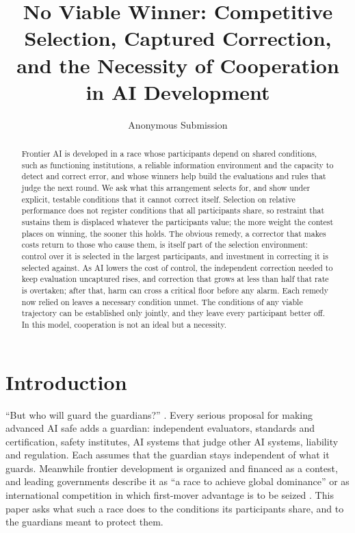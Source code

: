 \documentclass[letterpaper]{article} %
\title{No Viable Winner: Competitive Selection, Captured Correction,\\ and the Necessity of Cooperation in AI Development}
\author{Anonymous Submission}
\theoremstyle{definition}
\begin{document}
\maketitle

\begin{abstract}
Frontier AI is developed in a race whose participants depend on shared conditions, such as functioning institutions, a reliable information environment and the capacity to detect and correct error, and whose winners help build the evaluations and rules that judge the next round. We ask what this arrangement selects for, and show under explicit, testable conditions that it cannot correct itself. Selection on relative performance does not register conditions that all participants share, so restraint that sustains them is displaced whatever the participants value; the more weight the contest places on winning, the sooner this holds. The obvious remedy, a corrector that makes costs return to those who cause them, is itself part of the selection environment: control over it is selected in the largest participants, and investment in correcting it is selected against. As AI lowers the cost of control, the independent correction needed to keep evaluation uncaptured rises, and correction that grows at less than half that rate is overtaken; after that, harm can cross a critical floor before any alarm. Each remedy now relied on leaves a necessary condition unmet. The conditions of any viable trajectory can be established only jointly, and they leave every participant better off. In this model, cooperation is not an ideal but a necessity.
\end{abstract}

\section{Introduction}

``But who will guard the guardians?'' \citep{hurwicz2008}. Every serious proposal for making advanced AI safe adds a guardian: independent evaluators, standards and certification, safety institutes, AI systems that judge other AI systems, liability and regulation. Each assumes that the guardian stays independent of what it guards. Meanwhile frontier development is organized and financed as a contest, and leading governments describe it as ``a race to achieve global dominance'' \citep{whitehouse2025} or as international competition in which first-mover advantage is to be seized \citep{statecouncil2017}. This paper asks what such a race does to the conditions its participants share, and to the guardians meant to protect them.
\end{document}
